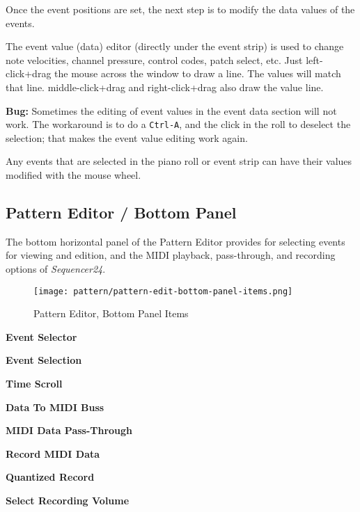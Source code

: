    Once the event positions are set, the next step is to modify the
   data values of the events.

	The event value (data) editor (directly under the event strip) is used 
	to change note velocities, channel pressure, control codes,
	patch select, etc.
   Just left-click+drag the mouse across the window to draw a line.  The
   values will match that line.  
   middle-click+drag and right-click+drag also
   draw the value line.

   \textbf{Bug:}
   Sometimes the editing of event values in the event data section will not work.
   The workaround is to do a \texttt{Ctrl-A}, and the click in the roll
   to deselect the selection; that makes the event value editing work again.
   
   Any events that are selected in the piano roll or event strip can have
   their values modified with the mouse wheel.

\subsection{Pattern Editor / Bottom Panel}
\label{subsec:seq24_pattern_editor_bottom}

   The bottom horizontal panel of the Pattern Editor provides for
   selecting events for viewing and edition, and the MIDI playback,
   pass-through, and recording options of \textsl{Sequencer24}.

\begin{figure}[H]
   \centering 
   \texttt{[image: pattern/pattern-edit-bottom-panel-items.png]}
   \caption{Pattern Editor, Bottom Panel Items}
   \label{fig:pattern_editor_bottom_panel_items}
\end{figure}

   \begin{enumber}
      \item \textbf{Event Selector}
      \item \textbf{Event Selection}
      \item \textbf{Time Scroll}
      \item \textbf{Data To MIDI Buss}
      \item \textbf{MIDI Data Pass-Through}
      \item \textbf{Record MIDI Data}
      \item \textbf{Quantized Record}
      \item \textbf{Select Recording Volume}
   \end{enumber}

